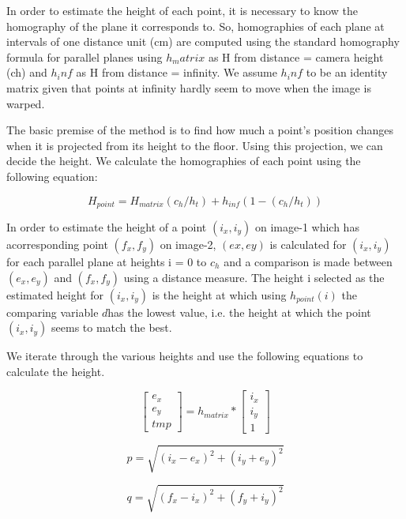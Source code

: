 \documentclass[11pt]{report}
\begin{document}
{{In order to estimate the height of each point, it is necessary to know the homography of the plane it corresponds to. So, homographies of each plane at intervals of one distance unit (cm) are computed using the standard homography formula for parallel planes using $h_matrix$ as H from distance = camera height (ch) and $h_inf$ as H from distance = infinity. We assume $h_inf$ to be an identity matrix given that points at infinity hardly seem to move when the image is warped. 

The basic premise of the method is to find how much a point's position changes when it is projected from its height to the floor. Using this projection, we can decide the height. We calculate the homographies of each point using the following equation:

\begin{equation}
H_{point} = H_{matrix}(c_h/h_t) + h_{inf}(1-(c_h/h_t))
\end{equation}
 

In order to estimate the height of a point $(i_x,i_y)$ on image-1 which has acorresponding point $(f_x,f_y)$ on image-2, $(ex,ey)$ is calculated for $(i_x,i_y)$ for each parallel plane at heights i = 0 to $c_h$ and a comparison is made between $(e_x,e_y)$ and $(f_x,f_y)$ using a distance measure. The height i selected as the estimated height for $(i_x,i_y)$ is the height at which using $h_{point}(i)$ the comparing variable $d$has the lowest value, i.e. the height at which the point $(i_x,i_y)$ seems to match the best.

We iterate through the various heights and use the following equations to calculate the height. 

\begin{equation}
\begin{bmatrix}
e_x \\ e_y \\ tmp 
\end{bmatrix}
= h_{matrix} * \begin{bmatrix}
i_x \\ i_y \\ 1
\end{bmatrix}
\end{equation} 

\begin{equation}
p = \sqrt{(i_x - e_x)^2 + (i_y + e_y)^2}
\end{equation} 

\begin{equation}
q = \sqrt{(f_x - i_x)^2 + (f_y + i_y)^2}
\end{equation} 

}}
\end{document}

